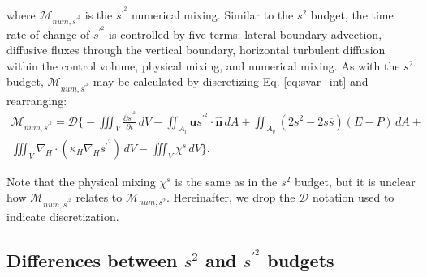 where $\mathcal{M}_{num, s^{\prime^2}}$ is the $s^{\prime^2}$ numerical mixing. Similar to the $s^2$ budget, the time rate of change of $s^{\prime^2}$ is controlled by five terms: lateral boundary advection, diffusive fluxes through the vertical boundary, horizontal turbulent diffusion within the control volume, physical mixing, and numerical mixing. As with the $s^2$ budget, $\mathcal{M}_{num, s^{\prime^2}}$ may be calculated by discretizing Eq. \ref{eq:svar_int} and rearranging:
\begin{equation} \label{eq:sprime2_mnum}
    \begin{split}
        \mathcal{M}_{num, s^{\prime^2}} = \mathcal{D} \biggl\{-\iiint_V \frac{\partial s^{\prime^2}}{\partial t} \, dV - \iint_{A_l} \mathbf{u}s^{\prime^2} \cdot \hat{\mathbf{n}} \,  dA + \iint_{A_{v}} \left(2s^2-2s \overline{s} \right)(E-P) \, dA + \\
        \iiint_{V} \nabla_H \cdot \left(\kappa_H \nabla_H s^{\prime^2} \right) \, dV - \iiint_V \chi^s \, dV\biggl\}.
   \end{split}
\end{equation}

Note that the physical mixing $\chi^s$ is the same as in the $s^2$ budget, but it is unclear how $\mathcal{M}_{num, s^{\prime^2}}$ relates to $\mathcal{M}_{num, s^2}$. Hereinafter, we drop the $\mathcal{D}{}$ notation used to indicate discretization.

\subsection{Differences between $s^2$ and $s^{\prime^2}$ budgets}

